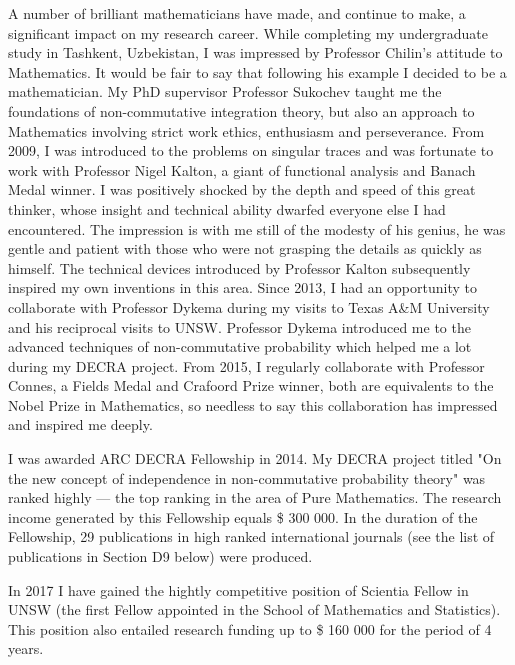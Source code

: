 \documentclass[12pt]{article}
\newcommand{\archeading}[1]{\vspace{.3cm} \noindent{\bfseries #1} \vspace{.1cm}   }
\begin{document}
A number of brilliant mathematicians have made, and continue to make, a significant impact on my research career. While completing my undergraduate study in Tashkent, Uzbekistan, I was impressed by Professor Chilin's attitude to Mathematics. It would be fair to say that following his example I decided to be a mathematician. My PhD supervisor Professor Sukochev taught me the foundations of non-commutative integration theory, but also an approach to Mathematics involving strict work ethics, enthusiasm and perseverance. From 2009, I was introduced to the problems on singular traces and was fortunate to work with Professor Nigel Kalton, a giant of functional analysis and Banach Medal winner. I was positively shocked by the depth and speed of this great thinker, whose insight and technical ability dwarfed everyone else I had encountered. The impression is with me still of the modesty of his genius, he was gentle and patient with those who were not grasping the details as quickly as himself. The technical devices introduced by Professor Kalton subsequently inspired my own inventions in this area. Since 2013, I had an opportunity to collaborate with Professor Dykema during my visits to Texas A\&M University and his reciprocal visits to UNSW. Professor Dykema introduced me to the advanced techniques of non-commutative probability which helped me a lot during my DECRA project. From 2015, I regularly collaborate with Professor Connes, a Fields Medal and Crafoord Prize winner, both are equivalents to the Nobel Prize in Mathematics, so needless to say this collaboration has impressed and inspired me deeply. %

\archeading{Research achievements and contributions}

I was awarded ARC DECRA Fellowship in 2014. My DECRA project titled "On the new concept of independence in non-commutative probability theory" was ranked highly --- the top ranking in the area of Pure Mathematics. The research income generated by this Fellowship equals \$ 300 000. In the duration of  the Fellowship, 29 publications in high ranked international journals (see the list of publications in Section D9 below) were produced.

In 2017 I have gained the hightly competitive position of Scientia Fellow in UNSW (the first Fellow appointed in the School of Mathematics and Statistics). This position also entailed research funding up to \$ 160 000 for the period of 4 years. 
\end{document}
